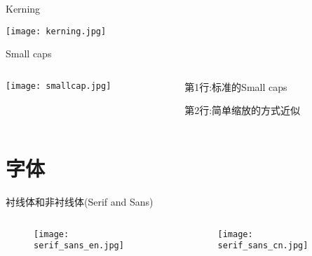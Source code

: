 ﻿\documentclass[hyperref={bookmarks=true},xcolor=pdflatex,svgnames,table,compress]{beamer}
\begin{document}
\begin{frame}{Kerning}

  \texttt{[image: kerning.jpg]}

\end{frame}

\begin{frame}{Small caps}

  \begin{columns}[T]

    \begin{column}{0.5\textwidth}
        \texttt{[image: smallcap.jpg]}

    \end{column}

    \begin{column}{0.5\textwidth}
      第1行:标准的Small caps

      第2行:简单缩放的方式近似
    \end{column}

  \end{columns}

\end{frame}


\section{字体}
\begin{frame}{衬线体和非衬线体(Serif and Sans)}
  \begin{columns}[c]

    \begin{column}{0.5\textwidth}
      \begin{figure}
        \texttt{[image: serif\_sans\_en.jpg]}
      \end{figure}

    \end{column}

    \begin{column}{0.5\textwidth}
      \begin{figure}
        \texttt{[image: serif\_sans\_cn.jpg]}
      \end{figure}
    \end{column}

  \end{columns}

\end{frame}
\end{document}
